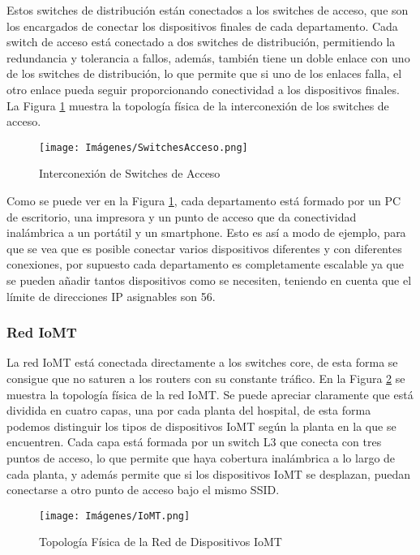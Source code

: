 Estos switches de distribución están conectados a los switches de acceso, que son los encargados de conectar los dispositivos finales de cada departamento. Cada switch de acceso 
está conectado a dos switches de distribución, permitiendo la redundancia y tolerancia a fallos, además, también tiene un doble enlace con uno de los switches de distribución, 
lo que permite que si uno de los enlaces falla, el otro enlace pueda seguir proporcionando conectividad a los dispositivos finales. La Figura \ref{fig:SwitchesAcceso} muestra la topología física de la interconexión de los switches de acceso.
\begin{figure}[H]
    \centering
    \texttt{[image: Imágenes/SwitchesAcceso.png]}
    \caption{Interconexión de Switches de Acceso}
    \label{fig:SwitchesAcceso}
\end{figure}

Como se puede ver en la Figura \ref{fig:SwitchesAcceso}, cada departamento está formado por un PC de escritorio, una impresora y un punto de acceso que da conectividad inalámbrica a un portátil y un smartphone. Esto es así 
a modo de ejemplo, para que se vea que es posible conectar varios dispositivos diferentes y con diferentes conexiones, por supuesto cada departamento es completamente escalable ya que se pueden añadir tantos dispositivos como se necesiten, teniendo en cuenta que el límite de direcciones IP asignables son 56.

\subsubsection{Red IoMT}
La red IoMT está conectada directamente a los switches core, de esta forma se consigue que no saturen a los routers con su constante tráfico. En la Figura \ref{fig:IoMT} se muestra la topología física de la red IoMT.
Se puede apreciar claramente que está dividida en cuatro capas, una por cada planta del hospital, de esta forma podemos distinguir los tipos de dispositivos IoMT según la planta en la que se encuentren. 
Cada capa está formada por un switch L3 que conecta con tres puntos de acceso, lo que permite que haya cobertura inalámbrica a lo largo de cada planta, y además permite que si los dispositivos IoMT se desplazan, puedan conectarse a otro punto de acceso bajo el mismo SSID.
 
\begin{figure}[H]
    \centering
    \texttt{[image: Imágenes/IoMT.png]}
    \caption{Topología Física de la Red de Dispositivos IoMT}
    \label{fig:IoMT}
\end{figure}

